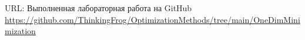 \documentclass[../body.tex]{subfiles}
\begin{document}
URL: Выполненная лабораторная работа на GitHub \\ \url{https://github.com/ThinkingFrog/OptimizationMethods/tree/main/OneDimMinimization}
\end{document}
